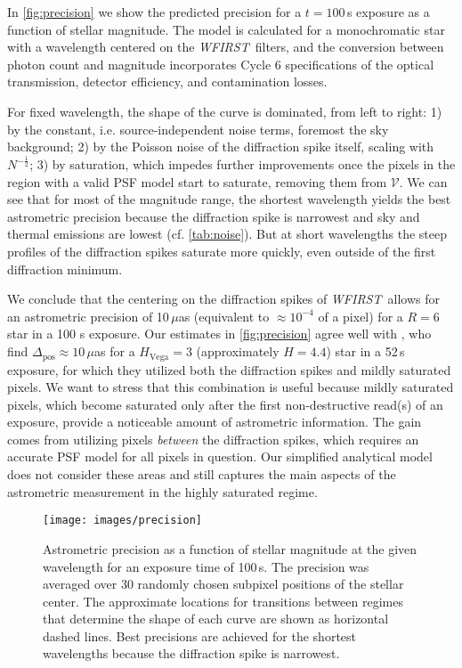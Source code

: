 \documentclass[modern, times]{aastex61}
\newcommand\wfirst{\textit{WFIRST}}
\begin{document}
In \autoref{fig:precision} we show the predicted precision for a $t=100$\,s exposure as a function of stellar magnitude.
The model is calculated for a monochromatic star with a wavelength centered on the \wfirst\ filters, and the conversion between photon count and magnitude incorporates Cycle 6 specifications of the optical transmission, detector efficiency, and contamination losses.
 
For fixed wavelength, the shape of the curve is dominated, from left to right:
1) by the constant, i.e. source-independent noise terms, foremost the sky background;
2) by the Poisson noise of the diffraction spike itself, scaling with $N^{-\frac{1}{2}}$; 
3) by saturation, which impedes further improvements once the pixels in the region with a valid PSF model start to saturate, removing them from $\mathcal{V}$. 
We can see that for most of the magnitude range, the shortest wavelength yields the best astrometric precision because the diffraction spike is narrowest and sky and thermal emissions are lowest (cf. \autoref{tab:noise}).
But at short wavelengths the steep profiles of the diffraction spikes saturate more quickly, even outside of the first diffraction minimum.

We conclude that the centering on the diffraction spikes of \wfirst\ allows for an astrometric precision of 10\,$\mu$as (equivalent to $\approx10^{-4}$ of a pixel) for a $R=6$ star in a 100 s exposure.
Our estimates in \autoref{fig:precision} agree well with \citet{Gould2015}, who find $\Delta_\mathrm{pos}\approx 10\,\mu$as for a $H_\mathrm{Vega}=3$ (approximately $H=4.4$) star in a 52\,s exposure, for which they utilized both the diffraction spikes and mildly saturated pixels.
We want to stress that this combination is useful because mildly saturated pixels, which become saturated only after the first non-destructive read(s) of an exposure, provide a noticeable amount of astrometric information.
The gain comes from utilizing pixels \emph{between} the diffraction spikes, which requires an accurate PSF model for all pixels in question.
Our simplified analytical model does not consider these areas and still captures the main aspects of the astrometric measurement in the highly saturated regime.

\begin{figure}[t]
\centering\texttt{[image: images/precision]}
\caption{Astrometric precision as a function of stellar magnitude at the given wavelength for an exposure time of 100\,s.
The precision was averaged over 30 randomly chosen subpixel positions of the stellar center.
The approximate locations for transitions between regimes that determine the shape of each curve are shown as horizontal dashed lines. 
Best precisions are achieved for the shortest wavelengths because the diffraction spike is narrowest.}
\label{fig:precision}
\end{figure}
\end{document}
